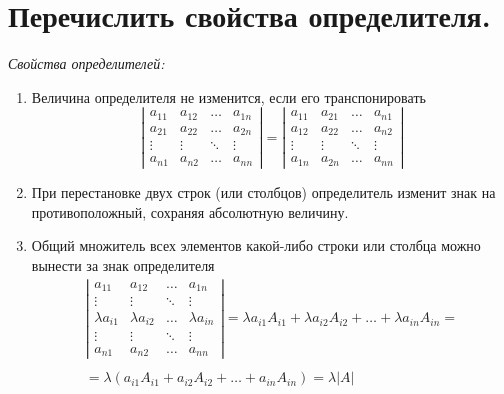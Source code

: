 \documentclass[12pt, fleqn]{article}
\begin{document}
\section{Перечислить свойства определителя.}
\textit{Свойства определителей:}
\begin{enumerate}
	\item Величина определителя не изменится, если его транспонировать
	\begin{equation*}
		\left|
		\begin{array}{cccc}
			a_{11} & a_{12} & \ldots & a_{1n}\\
			a_{21} & a_{22} & \ldots & a_{2n}\\
			\vdots & \vdots & \ddots & \vdots\\
			a_{n1} & a_{n2} & \ldots & a_{nn}
		\end{array}
		\right| = \left|
		\begin{array}{cccc}
			a_{11} & a_{21} & \ldots & a_{n1}\\
			a_{12} & a_{22} & \ldots & a_{n2}\\
			\vdots & \vdots & \ddots & \vdots\\
			a_{1n} & a_{2n} & \ldots & a_{nn}
		\end{array}
		\right|
	\end{equation*}
	\item При перестановке двух строк (или столбцов) определитель изменит знак на противоположный, сохраняя абсолютную величину.
	\item Общий множитель всех элементов какой-либо строки или столбца можно вынести за знак определителя\\
	\begin{multline*}
		\left|
		\begin{array}{cccc}
			a_{11} & a_{12} & \ldots & a_{1n}\\
			\vdots & \vdots & \ddots & \vdots\\
			\lambda a_{i1} & \lambda a_{i2} & \ldots & \lambda a_{in}\\
			\vdots & \vdots & \ddots & \vdots\\
			a_{n1} & a_{n2} & \ldots & a_{nn}
		\end{array}
		\right| = \lambda a_{i1}A_{i1}+\lambda a_{i2}A_{i2}+\dots+\lambda a_{in}A_{in}=\\\\
		=\lambda\left(a_{i1}A_{i1}+a_{i2}A_{i2}+\dots+ a_{in}A_{in}\right) = \lambda\left|A\right|\\
	\end{multline*}

\end{enumerate}
\end{document}
